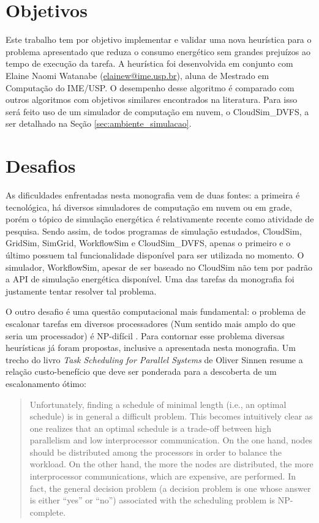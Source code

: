 \section{Objetivos}
\label{sec:objetivos}

Este trabalho tem por objetivo implementar e validar uma nova heurística para o
problema apresentado que reduza o consumo energético sem grandes prejuízos ao
tempo de execução da tarefa. A heurística foi desenvolvida em conjunto com
Elaine Naomi Watanabe (\url{elainew@ime.usp.br}), aluna de Mestrado em Computação
do IME/USP. O desempenho desse algoritmo é comparado com outros algoritmos com
objetivos similares encontrados na literatura. Para isso será feito uso de um
simulador de computação em nuvem, o CloudSim\_DVFS, a ser detalhado na Seção
\ref{sec:ambiente_simulacao}.


\section{Desafios}
\label{sec:desafios}

As dificuldades enfrentadas nesta monografia vem de duas fontes: a primeira é
tecnológica, há diversos simuladores de computação em nuvem ou em grade, porém o
tópico de simulação energética é relativamente recente como atividade de
pesquisa. Sendo assim, de todos programas de simulação estudados, CloudSim,
GridSim, SimGrid, WorkflowSim e CloudSim\_DVFS, apenas o primeiro e o último
possuem tal funcionalidade disponível para ser utilizada no momento. O
simulador, WorkflowSim, apesar de ser baseado no CloudSim  não tem por padrão a
API de simulação energética disponível. Uma das tarefas da monografia foi
justamente tentar resolver tal problema.

O outro desafio é uma questão computacional mais fundamental: o problema de
escalonar tarefas em diversos processadores (Num sentido mais amplo do que seria
um processador) é NP-difícil \cite{sinnen:task_scheduling_parallel_systems}.
Para contornar esse problema diversas heurísticas já foram propostas, inclusive
a apresentada nesta monografia. Um trecho do livro \emph{Task Scheduling for
Parallel Systems} de Oliver Sinnen resume a relação custo-benefício que deve ser
ponderada para a descoberta de um escalonamento ótimo:

\begin{quote}
	Unfortunately, finding a schedule of minimal length (i.e., an optimal schedule)
	is in general a difficult problem. This becomes intuitively clear as one realizes that
	an optimal schedule is a trade-off between high parallelism and low interprocessor
	communication. On the one hand, nodes should be distributed among the processors
	in order to balance the workload. On the other hand, the more the nodes are distributed,
	the more interprocessor communications, which are expensive, are performed. In fact,
	the general decision problem (a decision problem is one whose answer is either ``yes''
	or ``no'') associated with the scheduling problem is NP-complete. 
	\cite{sinnen:task_scheduling_parallel_systems}
\end{quote}



